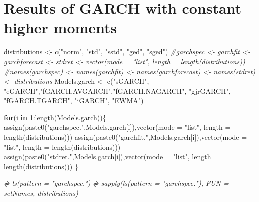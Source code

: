 \documentclass[a4paper, twoside]{templates/ociamthesis}
\newenvironment{Shaded}{\begin{snugshade}}{\end{snugshade}}
\newcommand{\AttributeTok}[1]{\textcolor[rgb]{0.77,0.63,0.00}{#1}}
\newcommand{\CommentTok}[1]{\textcolor[rgb]{0.56,0.35,0.01}{\textit{#1}}}
\newcommand{\ControlFlowTok}[1]{\textcolor[rgb]{0.13,0.29,0.53}{\textbf{#1}}}
\newcommand{\DecValTok}[1]{\textcolor[rgb]{0.00,0.00,0.81}{#1}}
\newcommand{\FunctionTok}[1]{\textcolor[rgb]{0.00,0.00,0.00}{#1}}
\newcommand{\NormalTok}[1]{#1}
\newcommand{\OtherTok}[1]{\textcolor[rgb]{0.56,0.35,0.01}{#1}}
\newcommand{\SpecialCharTok}[1]{\textcolor[rgb]{0.00,0.00,0.00}{#1}}
\newcommand{\StringTok}[1]{\textcolor[rgb]{0.31,0.60,0.02}{#1}}
\renewenvironment{Shaded}
{
  \vspace{10pt}%
  \begin{snugshade}%
}{%
  \end{snugshade}%
  \vspace{8pt}%
}
\begin{document}
\hypertarget{results-of-garch-with-constant-higher-moments}{%
\section{Results of GARCH with constant higher moments}\label{results-of-garch-with-constant-higher-moments}}

\begin{Shaded}
\begin{Highlighting}[]
\NormalTok{distributions }\OtherTok{\textless{}{-}} \FunctionTok{c}\NormalTok{(}\StringTok{"norm"}\NormalTok{, }\StringTok{"std"}\NormalTok{, }\StringTok{"sstd"}\NormalTok{, }\StringTok{"ged"}\NormalTok{, }\StringTok{"sged"}\NormalTok{)}
\CommentTok{\#garchspec \textless{}{-} garchfit \textless{}{-} garchforecast \textless{}{-} stdret \textless{}{-} vector(mode = "list", length = length(distributions))}
\CommentTok{\#names(garchspec) \textless{}{-} names(garchfit) \textless{}{-} names(garchforecast) \textless{}{-} names(stdret) \textless{}{-} distributions}
\NormalTok{Models.garch }\OtherTok{\textless{}{-}} \FunctionTok{c}\NormalTok{(}\StringTok{"sGARCH"}\NormalTok{, }\StringTok{"eGARCH"}\NormalTok{,}\StringTok{"fGARCH.AVGARCH"}\NormalTok{,}\StringTok{"fGARCH.NAGARCH"}\NormalTok{, }\StringTok{"gjrGARCH"}\NormalTok{, }\StringTok{"fGARCH.TGARCH"}\NormalTok{, }\StringTok{"iGARCH"}\NormalTok{, }\StringTok{"EWMA"}\NormalTok{)}

\ControlFlowTok{for}\NormalTok{(i }\ControlFlowTok{in} \DecValTok{1}\SpecialCharTok{:}\FunctionTok{length}\NormalTok{(Models.garch))\{}
\FunctionTok{assign}\NormalTok{(}\FunctionTok{paste0}\NormalTok{(}\StringTok{"garchspec."}\NormalTok{,Models.garch[i]),}\FunctionTok{vector}\NormalTok{(}\AttributeTok{mode =} \StringTok{"list"}\NormalTok{, }\AttributeTok{length =} \FunctionTok{length}\NormalTok{(distributions)))}
\FunctionTok{assign}\NormalTok{(}\FunctionTok{paste0}\NormalTok{(}\StringTok{"garchfit."}\NormalTok{,Models.garch[i]),}\FunctionTok{vector}\NormalTok{(}\AttributeTok{mode =} \StringTok{"list"}\NormalTok{, }\AttributeTok{length =} \FunctionTok{length}\NormalTok{(distributions)))}
\FunctionTok{assign}\NormalTok{(}\FunctionTok{paste0}\NormalTok{(}\StringTok{"stdret."}\NormalTok{,Models.garch[i]),}\FunctionTok{vector}\NormalTok{(}\AttributeTok{mode =} \StringTok{"list"}\NormalTok{, }\AttributeTok{length =} \FunctionTok{length}\NormalTok{(distributions)))}
\NormalTok{\} }

\CommentTok{\# ls(pattern = "garchspec.")}
\CommentTok{\# sapply(ls(pattern = "garchspec."), FUN = setNames, distributions)}


\end{Highlighting}
\end{Shaded}
\end{document}
